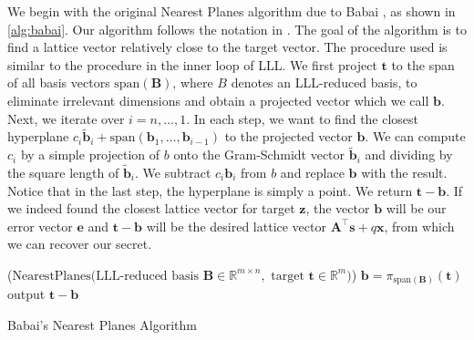 


We begin with the original Nearest Planes algorithm due to Babai \cite{Bab85}, as shown in \cref{alg:babai}. Our algorithm follows the notation in \cite{NPReg04}. The goal of the algorithm is to find a lattice vector relatively close to the target vector. The procedure used is similar to the procedure in the inner loop of LLL. We first project $\mathbf{t}$ to the span of all basis vectors $\text{span}(\mathbf{B})$, where $B$ denotes an LLL-reduced basis, to eliminate irrelevant dimensions and obtain a projected vector which we call $\mathbf{b}$. Next, we iterate over $i=n, \ldots, 1$. In each step, we want to find the closest hyperplane $c_i \tilde{\mathbf{b}}_i + \text{span}(\mathbf{b}_1, \dots, \mathbf{b}_{i-1})$ to the projected vector $\mathbf{b}$. We can compute $c_i$ by a simple projection of $b$ onto the Gram-Schmidt vector $\tilde{\mathbf{b}}_i$ and dividing by the square length of $\tilde{\mathbf{b}}_i$. We subtract $c_i \mathbf{b}_i$ from $b$ and replace $\mathbf{b}$ with the result. Notice that in the last step, the hyperplane is simply a point. We return $\mathbf{t} - \mathbf{b}$. If we indeed found the closest lattice vector for target $\mathbf{z}$, the vector $\mathbf{b}$ will be our error vector $\mathbf{e}$ and $\mathbf{t} - \mathbf{b}$ will be the desired lattice vector  $\mathbf{A}^\intercal \mathbf{s} + q \mathbf{x}$, from which we can recover our secret.

\begin{algorithm2e}
  \Begin($\text{NearestPlanes} {(}\text{LLL-reduced basis }\mathbf{B} \in \mathbb{R}^{m \times n},\text{ target }\mathbf{t}\in \mathbb{R}^{m}{)}$)
  {
    $\mathbf{b} = \pi_{\text{span}(\mathbf{B})}(\mathbf{t})$\\
    output $\mathbf{t} - \mathbf{b}$\\
  }
  \caption[Babai's Nearest Planes Algorithm]{Babai's Nearest Planes Algorithm \cite{Bab85}}\label{alg:babai} %
\end{algorithm2e}


